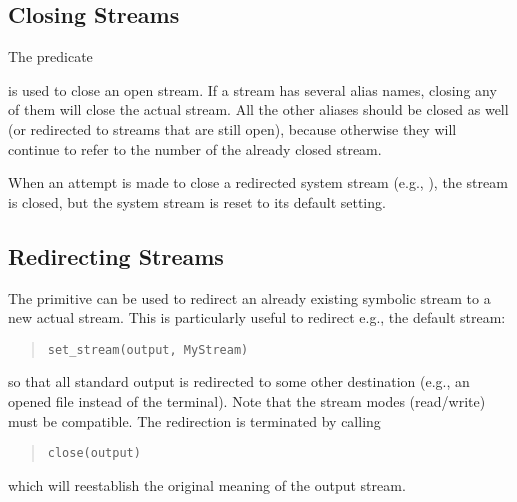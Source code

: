 \subsection{Closing Streams}

The predicate
\begin{quote}
\end{quote}
is used to close an open stream.
If a stream has several alias names, closing any of them will close
the actual stream. All the other aliases should be closed as well
(or redirected to streams that are still open),
because otherwise they will continue
to refer to the number of the already closed stream.

When an attempt is made to close a redirected system stream (e.g.,
),
the stream is closed, but the system stream is reset to its default setting.

\subsection{Redirecting Streams}

The 
primitive can be used to redirect an already existing symbolic stream
to a new actual stream.
This is particularly useful to redirect e.g., the default 
stream:
\begin{quote}
\begin{verbatim}
set_stream(output, MyStream)
\end{verbatim}
\end{quote}
so that all standard output is redirected to some other destination
(e.g., an opened file instead of the terminal).
Note that the stream modes (read/write) must be compatible.
The redirection is terminated by calling
\begin{quote}
\begin{verbatim}
close(output)
\end{verbatim}
\end{quote}
which will reestablish the original meaning of the output stream.



